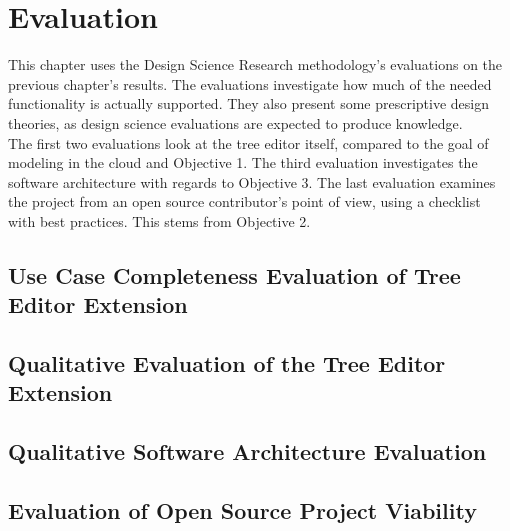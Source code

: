 \chapter{Evaluation}\label{chap:evaluation}

This chapter uses the Design Science Research methodology's evaluations on the previous chapter's results.
The evaluations investigate how much of the needed functionality is actually supported.
They also present some prescriptive design theories, as design science evaluations are expected to produce knowledge.\\

The first two evaluations look at the tree editor itself, compared to the goal of modeling in the cloud and Objective 1.
The third evaluation investigates the software architecture with regards to Objective 3.
The last evaluation examines the project from an \gls{open source} contributor's point of view, using a checklist with best practices.
This stems from Objective 2.

\section{Use Case Completeness Evaluation of Tree Editor Extension}




\section{Qualitative Evaluation of the Tree Editor Extension}




\section{Qualitative Software Architecture Evaluation}




\section{Evaluation of Open Source Project Viability}


